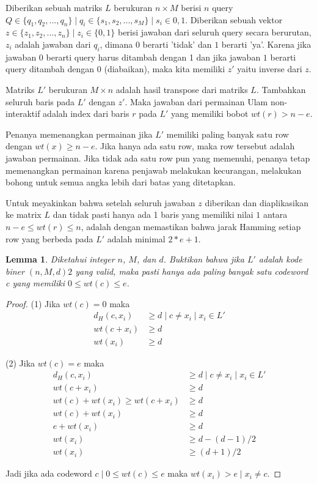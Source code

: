 \documentclass[conference,compsoc]{IEEEtran}
\newtheorem{lemma}[theorem]{Lemma}
\begin{document}
Diberikan sebuah matriks $L$ berukuran $n \times M$ berisi $n$ query $Q \in \{q_1,q_2,...,q_n\} \mid q_i \in \{s_1,s_2,...,s_M\} \mid s_i \in {0,1}$. Diberikan sebuah vektor $z \in \{z_1,z_2,...,z_n\} \mid z_i \in \{0,1\}$ berisi jawaban dari seluruh query secara berurutan, $z_i$ adalah jawaban dari $q_i$, dimana $0$ berarti 'tidak' dan $1$ berarti 'ya'. Karena jika jawaban $0$ berarti query harus ditambah dengan 1 dan jika jawaban $1$ berarti query ditambah dengan 0 (diabaikan), maka kita memiliki $z'$ yaitu inverse dari $z$. 

Matriks $L'$ berukuran $M \times n$ adalah hasil transpose dari matriks $L$. Tambahkan seluruh baris pada $L'$ dengan $z'$. Maka jawaban dari permainan Ulam non-interaktif adalah index dari baris $r$ pada $L'$ yang memiliki bobot $wt(r) > n-e$.

Penanya memenangkan permainan jika $L'$ memiliki paling banyak satu row dengan $wt(x) \ge n-e$. Jika hanya ada satu row, maka row tersebut adalah jawaban permainan. Jika tidak ada satu row pun yang memenuhi, penanya tetap memenangkan permainan karena penjawab melakukan kecurangan, melakukan bohong untuk semua angka lebih dari batas yang ditetapkan.

Untuk meyakinkan bahwa setelah seluruh jawaban $z$ diberikan dan diaplikasikan ke matrix $L$ dan tidak pasti hanya ada 1 baris yang memiliki nilai $1$ antara $n-e \le wt(r) \le n$, adalah dengan memastikan bahwa jarak Hamming setiap row yang berbeda pada $L'$ adalah minimal $2*e+1$.

\begin{lemma}
Diketahui integer $n$, $M$, dan $d$. Buktikan bahwa jika $L'$ adalah kode biner $(n,M,d)2$ yang valid, maka pasti hanya ada paling banyak satu codeword c yang memiliki $0 \le wt(c) \le e$.  
\end{lemma}

\begin{proof}
(1) Jika $wt(c) = 0$ maka
\begin{align*}
d_H(c,x_i) &\ge d \mid c \neq x_i \mid x_i \in L' \\
wt(c + x_i) &\ge d \\
wt(x_i) &\ge d
\end{align*}

(2) Jika $wt(c) = e$ maka
\begin{align*}
d_H(c,x_i) &\ge d \mid c \neq x_i \mid x_i \in L' \\
wt(c+x_i) &\ge d \\
wt(c) + wt(x_i) \ge wt(c+x_i) &\ge d \\
wt(c) + wt(x_i) &\ge d \\
e + wt(x_i) &\ge d \\
wt(x_i) &\ge d - (d-1)/2 \\
wt(x_i) &\ge (d+1)/2
\end{align*}

Jadi jika ada codeword $c \mid 0 \le wt(c) \le e$ maka $wt(x_i) > e \mid x_i \neq c$.
\end{proof}
\end{document}

